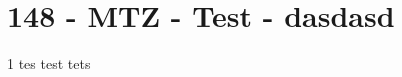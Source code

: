\section{148 - MTZ - Test - dasdasd}

\begin{langesbeispiel}\item[1] %
tes test tets

\end{langesbeispiel}